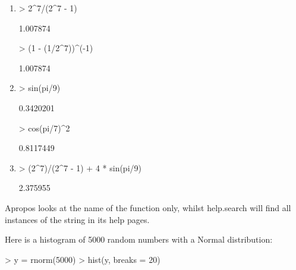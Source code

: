 \documentclass[11pt, oneside, reqno]{article}
\begin{document}
\begin{enumerate}
\item  
\begin{Schunk}
\begin{Sinput}
> 2^7/(2^7 - 1)
\end{Sinput}
\begin{Soutput}
[1] 1.007874
\end{Soutput}
\end{Schunk}

\begin{Schunk}
\begin{Sinput}
> (1 - (1/2^7))^(-1)
\end{Sinput}
\begin{Soutput}
[1] 1.007874
\end{Soutput}
\end{Schunk}

\item
\begin{Schunk}
\begin{Sinput}
> sin(pi/9)
\end{Sinput}
\begin{Soutput}
[1] 0.3420201
\end{Soutput}
\end{Schunk}
\begin{Schunk}
\begin{Sinput}
> cos(pi/7)^2
\end{Sinput}
\begin{Soutput}
[1] 0.8117449
\end{Soutput}
\end{Schunk}

\item
\begin{Schunk}
\begin{Sinput}
> (2^7)/(2^7 - 1) + 4 * sin(pi/9)
\end{Sinput}
\begin{Soutput}
[1] 2.375955
\end{Soutput}
\end{Schunk}
\end{enumerate}
\eans

Apropos looks at the name of the function only, whilst help.search will find all instances of the string in its help pages.

\eans

Here is a histogram of 5000 random numbers with a Normal distribution:

\begin{Schunk}
\begin{Sinput}
> y = rnorm(5000)
> hist(y, breaks = 20)
\end{Sinput}
\end{Schunk}
\end{document}
